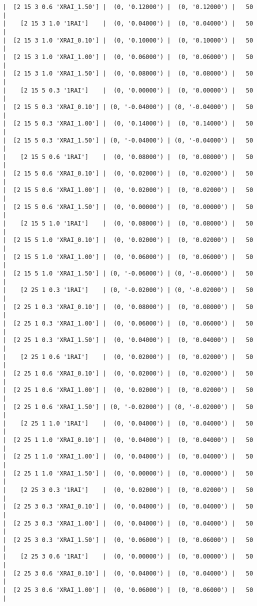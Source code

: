 \documentclass{article}
\begin{document}
\begin{verbatim}
|  [2 15 3 0.6 'XRAI_1.50'] |  (0, '0.12000') |  (0, '0.12000') |   50  |
|    [2 15 3 1.0 '1RAI']    |  (0, '0.04000') |  (0, '0.04000') |   50  |
|  [2 15 3 1.0 'XRAI_0.10'] |  (0, '0.10000') |  (0, '0.10000') |   50  |
|  [2 15 3 1.0 'XRAI_1.00'] |  (0, '0.06000') |  (0, '0.06000') |   50  |
|  [2 15 3 1.0 'XRAI_1.50'] |  (0, '0.08000') |  (0, '0.08000') |   50  |
|    [2 15 5 0.3 '1RAI']    |  (0, '0.00000') |  (0, '0.00000') |   50  |
|  [2 15 5 0.3 'XRAI_0.10'] | (0, '-0.04000') | (0, '-0.04000') |   50  |
|  [2 15 5 0.3 'XRAI_1.00'] |  (0, '0.14000') |  (0, '0.14000') |   50  |
|  [2 15 5 0.3 'XRAI_1.50'] | (0, '-0.04000') | (0, '-0.04000') |   50  |
|    [2 15 5 0.6 '1RAI']    |  (0, '0.08000') |  (0, '0.08000') |   50  |
|  [2 15 5 0.6 'XRAI_0.10'] |  (0, '0.02000') |  (0, '0.02000') |   50  |
|  [2 15 5 0.6 'XRAI_1.00'] |  (0, '0.02000') |  (0, '0.02000') |   50  |
|  [2 15 5 0.6 'XRAI_1.50'] |  (0, '0.00000') |  (0, '0.00000') |   50  |
|    [2 15 5 1.0 '1RAI']    |  (0, '0.08000') |  (0, '0.08000') |   50  |
|  [2 15 5 1.0 'XRAI_0.10'] |  (0, '0.02000') |  (0, '0.02000') |   50  |
|  [2 15 5 1.0 'XRAI_1.00'] |  (0, '0.06000') |  (0, '0.06000') |   50  |
|  [2 15 5 1.0 'XRAI_1.50'] | (0, '-0.06000') | (0, '-0.06000') |   50  |
|    [2 25 1 0.3 '1RAI']    | (0, '-0.02000') | (0, '-0.02000') |   50  |
|  [2 25 1 0.3 'XRAI_0.10'] |  (0, '0.08000') |  (0, '0.08000') |   50  |
|  [2 25 1 0.3 'XRAI_1.00'] |  (0, '0.06000') |  (0, '0.06000') |   50  |
|  [2 25 1 0.3 'XRAI_1.50'] |  (0, '0.04000') |  (0, '0.04000') |   50  |
|    [2 25 1 0.6 '1RAI']    |  (0, '0.02000') |  (0, '0.02000') |   50  |
|  [2 25 1 0.6 'XRAI_0.10'] |  (0, '0.02000') |  (0, '0.02000') |   50  |
|  [2 25 1 0.6 'XRAI_1.00'] |  (0, '0.02000') |  (0, '0.02000') |   50  |
|  [2 25 1 0.6 'XRAI_1.50'] | (0, '-0.02000') | (0, '-0.02000') |   50  |
|    [2 25 1 1.0 '1RAI']    |  (0, '0.04000') |  (0, '0.04000') |   50  |
|  [2 25 1 1.0 'XRAI_0.10'] |  (0, '0.04000') |  (0, '0.04000') |   50  |
|  [2 25 1 1.0 'XRAI_1.00'] |  (0, '0.04000') |  (0, '0.04000') |   50  |
|  [2 25 1 1.0 'XRAI_1.50'] |  (0, '0.00000') |  (0, '0.00000') |   50  |
|    [2 25 3 0.3 '1RAI']    |  (0, '0.02000') |  (0, '0.02000') |   50  |
|  [2 25 3 0.3 'XRAI_0.10'] |  (0, '0.04000') |  (0, '0.04000') |   50  |
|  [2 25 3 0.3 'XRAI_1.00'] |  (0, '0.04000') |  (0, '0.04000') |   50  |
|  [2 25 3 0.3 'XRAI_1.50'] |  (0, '0.06000') |  (0, '0.06000') |   50  |
|    [2 25 3 0.6 '1RAI']    |  (0, '0.00000') |  (0, '0.00000') |   50  |
|  [2 25 3 0.6 'XRAI_0.10'] |  (0, '0.04000') |  (0, '0.04000') |   50  |
|  [2 25 3 0.6 'XRAI_1.00'] |  (0, '0.06000') |  (0, '0.06000') |   50  |

\end{verbatim}
\end{document}
